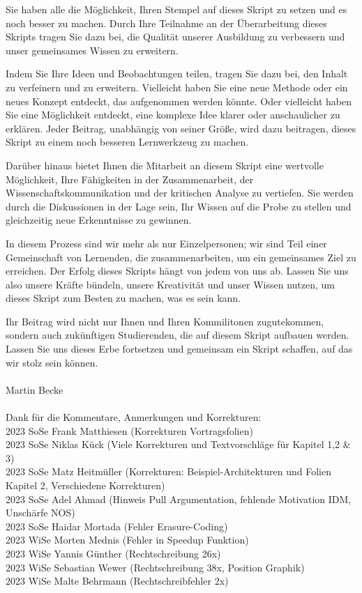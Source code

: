 \documentclass[a4paper]{article}
\begin{document}
Sie haben alle die Möglichkeit, Ihren Stempel auf dieses Skript zu setzen und es noch besser zu machen. Durch Ihre Teilnahme an der Überarbeitung dieses Skripts tragen Sie dazu bei, die Qualität unserer Ausbildung zu verbessern und unser gemeinsames Wissen zu erweitern.

Indem Sie Ihre Ideen und Beobachtungen teilen, tragen Sie dazu bei, den Inhalt zu verfeinern und zu erweitern. Vielleicht haben Sie eine neue Methode oder ein neues Konzept entdeckt, das aufgenommen werden könnte. Oder vielleicht haben Sie eine Möglichkeit entdeckt, eine komplexe Idee klarer oder anschaulicher zu erklären. Jeder Beitrag, unabhängig von seiner Größe, wird dazu beitragen, dieses Skript zu einem noch besseren Lernwerkzeug zu machen.

Darüber hinaus bietet Ihnen die Mitarbeit an diesem Skript eine wertvolle Möglichkeit, Ihre Fähigkeiten in der Zusammenarbeit, der Wissenschaftskommunikation und der kritischen Analyse zu vertiefen. Sie werden durch die Diskussionen in der Lage sein, Ihr Wissen auf die Probe zu stellen und gleichzeitig neue Erkenntnisse zu gewinnen.

In diesem Prozess sind wir mehr als nur Einzelpersonen; wir sind Teil einer Gemeinschaft von Lernenden, die zusammenarbeiten, um ein gemeinsames Ziel zu erreichen. Der Erfolg dieses Skripts hängt von jedem von uns ab. Lassen Sie uns also unsere Kräfte bündeln, unsere Kreativität und unser Wissen nutzen, um dieses Skript zum Besten zu machen, was es sein kann.

Ihr Beitrag wird nicht nur Ihnen und Ihren Kommilitonen zugutekommen, sondern auch zukünftigen Studierenden, die auf diesem Skript aufbauen werden. Lassen Sie uns dieses Erbe fortsetzen und gemeinsam ein Skript schaffen, auf das wir stolz sein können.
\\\\
Martin Becke
\\\\
Dank für die Kommentare, Anmerkungen und Korrekturen:  \\
2023 SoSe Frank Matthiesen (Korrekturen Vortragsfolien) \\
2023 SoSe Niklas Kück (Viele Korrekturen und Textvorschläge für Kapitel 1,2 \& 3)\\
2023 SoSe Matz Heitmüller (Korrekturen: Beispiel-Architekturen und Folien Kapitel 2, Verschiedene Korrekturen) \\
2023 SoSe Adel Ahmad (Hinweis Pull Argumentation, fehlende Motivation IDM, Unschärfe NOS) \\
2023 SoSe Haidar Mortada (Fehler  Erasure-Coding) \\  
2023 WiSe Morten Mednis (Fehler in Speedup Funktion) \\
2023 WiSe Yannis Günther (Rechtschreibung 26x) \\
2023 WiSe Sebastian Wewer (Rechtschreibung 38x, Position Graphik) \\
2023 WiSe Malte Behrmann (Rechtschreibfehler 2x)\\
\\
\end{document}
